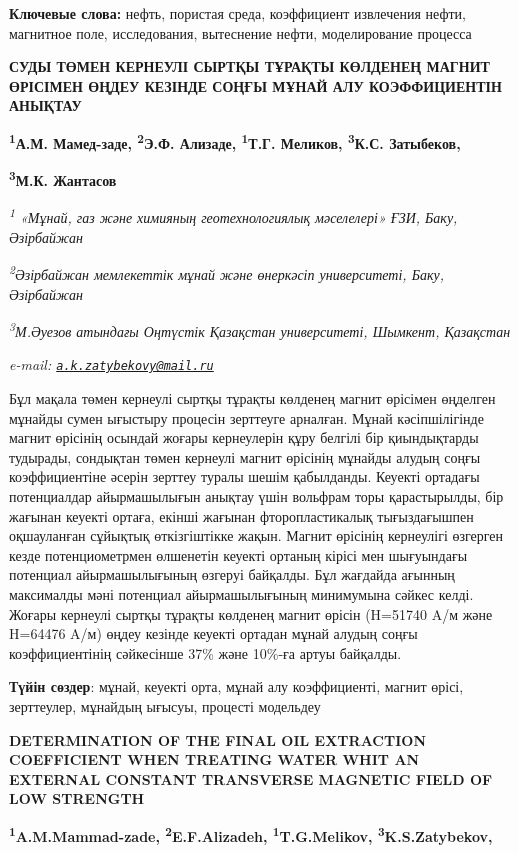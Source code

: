 {{{\bfseries Ключевые слова:} нефть, пористая среда, коэффициент извлечения
нефти, магнитное поле, исследования, вытеснение нефти, моделирование
процесса

{\bfseries СУДЫ ТӨМЕН КЕРНЕУЛІ СЫРТҚЫ ТҰРАҚТЫ КӨЛДЕНЕҢ МАГНИТ ӨРІСІМЕН
ӨҢДЕУ КЕЗІНДЕ СОҢҒЫ МҰНАЙ АЛУ КОЭФФИЦИЕНТІН АНЫҚТАУ}

{\bfseries \textsuperscript{1}А.М. Мамед-заде, \textsuperscript{2}Э.Ф.
Ализаде, \textsuperscript{1}Т.Г. Меликов, \textsuperscript{3}К.С.
Затыбеков,}

{\bfseries \textsuperscript{3}М.К. Жантасов}

\emph{\textsuperscript{1} «Мұнай, газ және химияның геотехнологиялық
мәселелері» ҒЗИ, Баку, Әзірбайжан}

\emph{\textsuperscript{2}Әзірбайжан мемлекеттік мұнай және өнеркәсіп
университеті, Баку, Әзірбайжан}

\emph{\textsuperscript{3}М.Әуезов атындағы Оңтүстік Қазақстан
университеті, Шымкент, Қазақстан}

\emph{e-mail:
\href{mailto:a.k.zatybekovy@mail.ru}{\nolinkurl{a.k.zatybekovy@mail.ru}}}

Бұл мақала төмен кернеулі сыртқы тұрақты көлденең магнит өрісімен
өңделген мұнайды сумен ығыстыру процесін зерттеуге арналған. Мұнай
кәсіпшілігінде магнит өрісінің осындай жоғары кернеулерін құру белгілі
бір қиындықтарды тудырады, сондықтан төмен кернеулі магнит өрісінің
мұнайды алудың соңғы коэффициентіне әсерін зерттеу туралы шешім
қабылданды. Кеуекті ортадағы потенциалдар айырмашылығын анықтау үшін
вольфрам торы қарастырылды, бір жағынан кеуекті ортаға, екінші жағынан
фторопластикалық тығыздағышпен оқшауланған сұйықтық өткізгіштікке жақын.
Магнит өрісінің кернеулігі өзгерген кезде потенциометрмен өлшенетін
кеуекті ортаның кірісі мен шығуындағы потенциал айырмашылығының өзгеруі
байқалды. Бұл жағдайда ағынның максималды мәні потенциал айырмашылығының
минимумына сәйкес келді. Жоғары кернеулі сыртқы тұрақты көлденең магнит
өрісін (H=51740 A/м және H=64476 A/м) өңдеу кезінде кеуекті ортадан
мұнай алудың соңғы коэффициентінің сәйкесінше 37\% және 10\%-ға артуы
байқалды.

{\bfseries Түйін сөздер}: мұнай, кеуекті орта, мұнай алу коэффициенті,
магнит өрісі, зерттеулер, мұнайдың ығысуы, процесті модельдеу

{\bfseries DETERMINATION OF THE FINAL OIL EXTRACTION COEFFICIENT WHEN
TREATING WATER WHIT AN EXTERNAL CONSTANT TRANSVERSE MAGNETIC FIELD OF
LOW STRENGTH}

{\bfseries \textsuperscript{1}A.M.Mammad-zade,
\textsuperscript{2}E.F.Alizadeh, \textsuperscript{1}T.G.Melikov,
\textsuperscript{3}K.S.Zatybekov,}

}}
